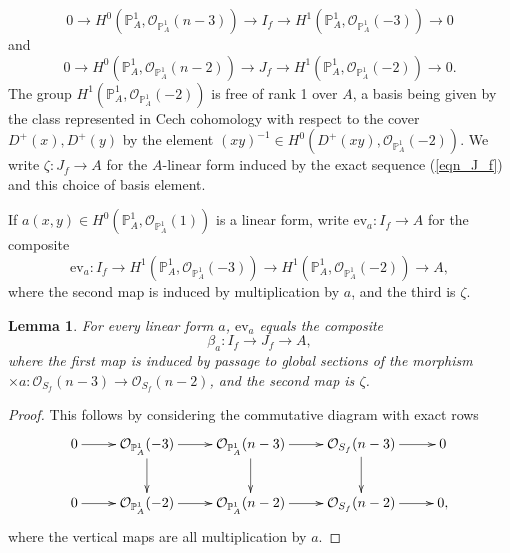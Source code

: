 \documentclass{article} %
\newtheorem{lemma}[proposition]{Lemma}
\numberwithin{equation}{section}
\newcommand{\bbP}{\mathbb{P}}
\newcommand{\cO}{\mathcal{O}}
\begin{document}
\begin{equation}\label{eqn_I_f} 0 \to H^0(\bbP^1_A, \cO_{\bbP^1_A}(n-3)) \to I_f \to H^1(\bbP^1_A, \cO_{\bbP^1_A}(-3)) \to 0 
\end{equation}
and
\begin{equation}\label{eqn_J_f} 0 \to  H^0(\bbP^1_A, \cO_{\bbP^1_A}(n-2)) \to J_f \to H^1(\bbP^1_A, \cO_{\bbP^1_A}(-2)) \to 0. 
\end{equation}
The group $H^1(\bbP^1_A, \cO_{\bbP^1_A}(-2))$ is free of rank 1 over $A$, a basis being given by the class represented in Cech cohomology with respect to the cover $D^+(x), D^+(y)$ by the element $(xy)^{-1} \in H^0(D^+(xy), \cO_{\bbP^1_A}(-2))$. We write $\zeta : J_f \to A$ for the $A$-linear form induced by the exact sequence (\ref{eqn_J_f}) and this choice of basis element. 

If $a(x, y) \in H^0(\bbP^1_A, \cO_{\bbP^1_A}(1))$ is a linear form, write $\mathrm{ev}_a : I_f \to A$ for the composite
\[\mathrm{ev}_a\colon  I_f \to H^1(\bbP^1_A, \cO_{\bbP^1_A}(-3)) \to H^1(\bbP^1_A, \cO_{\bbP^1_A}(-2)) \to A, \]
where the second map is induced by multiplication by $a$, and the third is $\zeta$.

\begin{lemma}\label{lemma_identificationconnectingmaps}
    For every linear form $a$, $\mathrm{ev}_a$ equals the composite
    \[\beta_a\colon  I_f \to J_f \to A, \]
    where the first map is induced by passage to global sections of the morphism $\times a : \cO_{S_f}(n-3) \to \cO_{S_f}(n-2)$, and the second map is $\zeta$.
\end{lemma}
\begin{proof}
     This follows by considering the commutative diagram with exact rows
    \[ \xymatrix{ 0 \ar[r] & \cO_{\bbP^1_A}(-3)\ar[d] \ar[r] & \cO_{\bbP^1_A}(n-3) \ar[d] \ar[r] & \cO_{S_f}(n-3) \ar[d] \ar[r] & 0 \\ 
    0 \ar[r] & \cO_{\bbP^1_A}(-2) \ar[r] & \cO_{\bbP^1_A}(n-2) \ar[r] & \cO_{S_f}(n-2)  \ar[r] & 0, }
    \]
    where the vertical maps are all multiplication by $a$. 
\end{proof}
\end{document}
